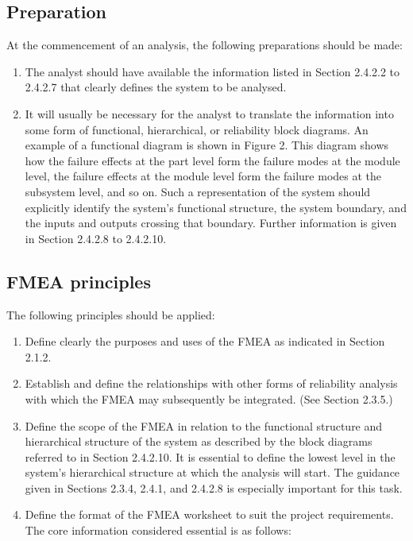 \documentclass[./dissertation.tex]{subfiles}
\begin{document}
\subsection{Preparation}
At the commencement of an analysis, the following preparations should be made:
\begin{enumerate}
\item The analyst should have available the information listed in Section 2.4.2.2 to 2.4.2.7 that clearly defines the system to be analysed.
\item It will usually be necessary for the analyst to translate the information into some form of functional, hierarchical, or reliability block diagrams. An example of a functional diagram is shown in Figure 2. This diagram shows how the failure effects at the part level form the failure modes at the module level, the failure effects at the module level form the failure modes at the subsystem level, and so on. Such a representation of the system should explicitly identify the system's functional structure, the system boundary, and the inputs and outputs crossing that boundary. Further information is given in Section 2.4.2.8 to 2.4.2.10.
\end{enumerate}

\subsection{FMEA principles}
The following principles should be applied:
\begin{enumerate}
\item Define clearly the purposes and uses of the FMEA as indicated in Section 2.1.2.
\item Establish and define the relationships with other forms of reliability analysis with which the FMEA may subsequently be integrated. (See Section 2.3.5.)
\item Define the scope of the FMEA in relation to the functional structure and hierarchical structure of the system as described by the block diagrams referred to in Section 2.4.2.10. It is essential to define the lowest level in the system's hierarchical structure at which the analysis will start. The guidance given in Sections 2.3.4, 2.4.1, and 2.4.2.8 is especially important for this task.
\item Define the format of the FMEA worksheet to suit the project requirements. The core information considered essential is as follows:
\end{enumerate}
\end{document}
